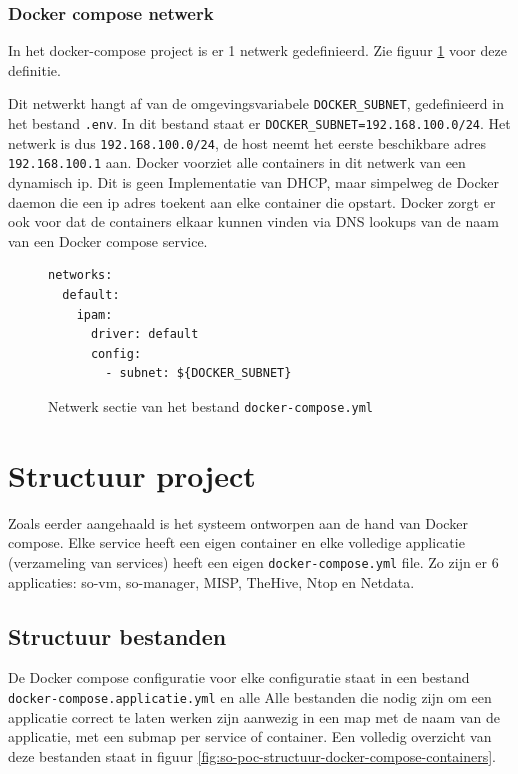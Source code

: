 \documentclass[a4paper,12pt]{report}
\begin{document}
\subsubsection{Docker compose netwerk}
In het docker-compose project is er 1 netwerk gedefinieerd.
Zie figuur \ref{fig:docker-compose-network} voor deze definitie.

Dit netwerkt hangt af van de omgevingsvariabele \lstinline|DOCKER_SUBNET|, gedefinieerd in het bestand \lstinline|.env|.
In dit bestand staat er \lstinline|DOCKER_SUBNET=192.168.100.0/24|.
Het netwerk is dus \lstinline|192.168.100.0/24|, de host neemt het eerste beschikbare adres \lstinline|192.168.100.1| aan.
Docker voorziet alle containers in dit netwerk van een dynamisch ip.
Dit is geen Implementatie van DHCP, maar simpelweg de Docker daemon die een ip adres toekent aan elke container die opstart.
Docker zorgt er ook voor dat de containers elkaar kunnen vinden via DNS lookups van de naam van een Docker compose service. 

\begin{figure}[H]
  \begin{lstlisting}
networks:
  default:
    ipam:
      driver: default
      config:
        - subnet: ${DOCKER_SUBNET}
  \end{lstlisting}
  \caption{Netwerk sectie van het bestand \lstinline|docker-compose.yml|}
  \label{fig:docker-compose-network}
\end{figure}

\section{Structuur project}
Zoals eerder aangehaald is het systeem ontworpen aan de hand van Docker compose.
Elke service heeft een eigen container en elke volledige applicatie (verzameling van services) heeft een eigen \lstinline|docker-compose.yml| file.
Zo zijn er 6 applicaties: so-vm, so-manager, MISP, TheHive, Ntop en Netdata.

\subsection{Structuur bestanden}
De Docker compose configuratie voor elke configuratie staat in een bestand \lstinline|docker-compose.applicatie.yml| en alle 
Alle bestanden die nodig zijn om een applicatie correct te laten werken zijn aanwezig in een map met de naam van de applicatie, met een submap per service of container.
Een volledig overzicht van deze bestanden staat in figuur \ref{fig:so-poc-structuur-docker-compose-containers}.
\end{document}
